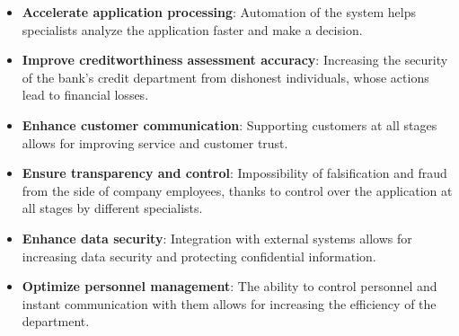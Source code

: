 \documentclass[20pt]{article}
\begin{document}
\begin{itemize}
    \item \textbf{Accelerate application processing}: Automation of the system helps specialists analyze the application faster and make a decision.
    \item \textbf{Improve creditworthiness assessment accuracy}: Increasing the security of the bank's credit department from dishonest individuals, whose actions lead to financial losses.
    \item \textbf{Enhance customer communication}: Supporting customers at all stages allows for improving service and customer trust.
    \item \textbf{Ensure transparency and control}: Impossibility of falsification and fraud from the side of company employees, thanks to control over the application at all stages by different specialists.
    \item \textbf{Enhance data security}: Integration with external systems allows for increasing data security and protecting confidential information.
    \item \textbf{Optimize personnel management}: The ability to control personnel and instant communication with them allows for increasing the efficiency of the department.
\end{itemize}


\end{document}
